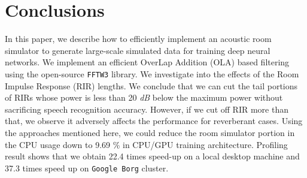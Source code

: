 \documentclass[a4paper]{article}
\begin{document}
\section{Conclusions}
In this paper, we describe how to efficiently implement
an acoustic room simulator to generate large-scale
simulated data for training deep neural networks.
We implement an efficient OverLap
Addition (OLA) based filtering using the open-source \texttt{FFTW3}
library. We investigate into the effects of the Room
Impulse Response (RIR) lengths. We conclude that we can cut
the tail portions of RIRs whose power is less than 20 \textit{dB}
below the maximum power without sacrificing speech recognition accuracy.
However, if we cut off RIR more than that, we observe it adversely
affects the performance for reverberant cases.
Using the approaches mentioned here, we could reduce the
room simulator portion in the CPU usage down to 9.69 \%
in CPU/GPU training architecture. Profiling result shows that
we obtain 22.4 times speed-up on a local desktop machine and 37.3 times
speed up on \texttt{Google Borg} cluster.
%
%
\eightpt


%
%
%
\end{document}
